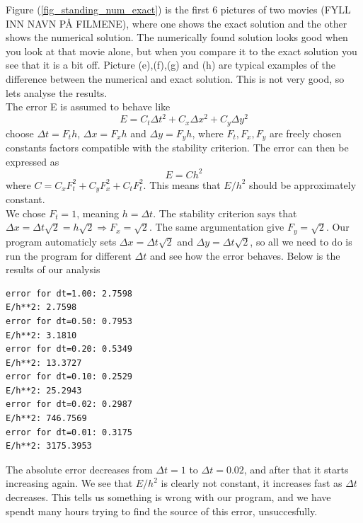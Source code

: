 Figure (\ref{fig_standing_num_exact}) is the first 6 pictures of two movies (FYLL INN NAVN PÅ FILMENE), where one shows the exact solution and the other shows the
numerical solution. The numerically found solution looks good when you look at that movie alone, but when you compare it to the exact solution you see that
it is a bit off. Picture (e),(f),(g) and (h) are typical examples of the difference between the numerical and exact solution. This is not very good, so lets analyse the results.\\
The error E is assumed to behave like
\begin{equation}
 E = C_t \Delta t^2 + C_x \Delta x^2 + C_y \Delta y^2
\end{equation}
choose $\Delta t = F_th$, $\Delta x = F_x h$ and $\Delta y = F_y h$, where $F_t,F_x,F_y$ are freely chosen constants factors compatible with the stability criterion.
The error can then be expressed as
\begin{equation}
 E = Ch^2
\end{equation}
where $C = C_xF_t^2 + C_yF_x^2 + C_tF_t^2$. This means that $E/h^2$ should be approximately constant.\\
We chose $F_t=1$, meaning $h = \Delta t$. The stability criterion says that $\Delta x = \Delta t \sqrt{2} = h\sqrt{2} \Rightarrow F_x = \sqrt{2}$.
The same argumentation give $F_y = \sqrt{2}$. Our program automaticly sets $\Delta x = \Delta t\sqrt{2}$ and $\Delta y = \Delta t \sqrt{2}$, so all we need to do
is run the program for different $\Delta t$ and see how the error behaves. Below is the results of our analysis

\begin{verbatim}
error for dt=1.00: 2.7598 
E/h**2: 2.7598 
error for dt=0.50: 0.7953 
E/h**2: 3.1810 
error for dt=0.20: 0.5349 
E/h**2: 13.3727 
error for dt=0.10: 0.2529 
E/h**2: 25.2943 
error for dt=0.02: 0.2987 
E/h**2: 746.7569 
error for dt=0.01: 0.3175 
E/h**2: 3175.3953 
\end{verbatim}

The absolute error decreases from $\Delta t = 1$ to $\Delta t = 0.02$, and after that it starts increasing again. We see that $E/h^2$ is clearly not 
constant, it increases fast as $\Delta t$ decreases. This tells us something is wrong with our program, and we have spendt many hours trying to find 
the source of this error, unsuccesfully. 






